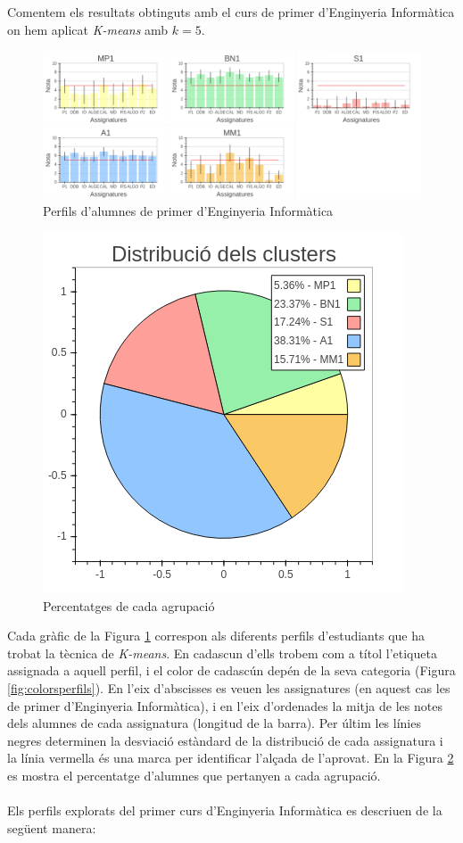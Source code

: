 \documentclass[12pt,a4paper,catalan]{article}
\begin{document}
\newpage

Comentem els resultats obtinguts amb el curs de primer d'Enginyeria Informàtica on hem aplicat \textit{K-means} amb $k=5$.

\begin{figure}[h]
\centering
\includegraphics[width=\linewidth]{img/perfils_primer_info.png}
\caption{Perfils d'alumnes de primer d'Enginyeria Informàtica}
\label{fig:perfilsprimerinfo}
\end{figure}

\begin{figure}[h]
\centering
\includegraphics[width=.55\linewidth]{img/perfils_primer_info_pastilla.png}
\caption{Percentatges de cada agrupació}
\label{fig:pasprimerinfo}
\end{figure}

Cada gràfic de la Figura \ref{fig:perfilsprimerinfo} correspon als diferents perfils d'estudiants que ha trobat la tècnica de \textit{K-means}. En cadascun d'ells trobem com a títol l'etiqueta assignada a aquell perfil, i el color de cadascún depén de la seva categoria (Figura \ref{fig:colorsperfils}). En l'eix d'abscisses es veuen les assignatures (en aquest cas les de primer d'Enginyeria Informàtica), i en l'eix d'ordenades la mitja de les notes dels alumnes de cada assignatura (longitud de la barra). Per últim les línies negres determinen la desviació estàndard de la distribució de cada assignatura i la línia vermella és una marca per identificar l'alçada de l'aprovat. En la Figura \ref{fig:pasprimerinfo} es mostra el percentatge d'alumnes que pertanyen a cada agrupació.
\\
\\
Els perfils explorats del primer curs d'Enginyeria Informàtica es descriuen de la següent manera:
\end{document}
